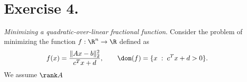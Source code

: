 \section*{Exercise 4.}

\textit{Minimizing a quadratic-over-linear fractional function}. Consider the problem of minimizing the function $f:\R^n \to \R$ defined as
\[ f(x) = \frac{\|Ax-b\|_2^2}{c^T x+ d},\hspace{2em}  \dom(f) = \{x \;:\; c^T x + d > 0\}.\] 
We assume $\rank A$